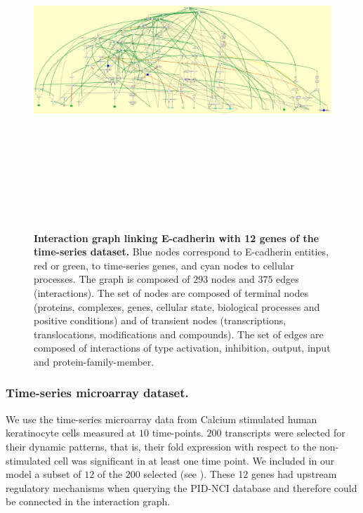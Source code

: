 \begin{figure}[!p]
 \centering
 \includegraphics[width=7.5in, height=5in, angle=-90]{images/net.jpg}
\caption{{\bf  Interaction graph linking E-cadherin with 12 genes of the time-series dataset.} Blue nodes correspond to E-cadherin entities, red or green, to time-series genes, 
and cyan nodes to cellular processes. The graph is composed of $293$ nodes and $375$ edges (interactions).
The set of nodes are composed of terminal nodes (proteins, complexes, genes, cellular state, biological processes and positive conditions) and of transient
nodes (transcriptions, translocations, modifications and compounds). The set of edges are composed of interactions of type activation, inhibition, output, 
input and protein-family-member.} 
 \label{fig:network}
\end{figure}

\subsubsection{Time-series microarray dataset.}
\label{SECTSD}
We use the time-series microarray data from Calcium stimulated human keratinocyte cells 
 measured at $10$ time-points. $200$ transcripts were selected for their dynamic patterns,
that is, their fold expression with respect to the non-stimulated cell was significant in at least one time point. 
We included in our model a subset of $12$ of the $200$ selected (see ).  
These 12 genes had upstream regulatory mechanisms when querying the 
PID-NCI database and therefore could be connected in the interaction graph.

